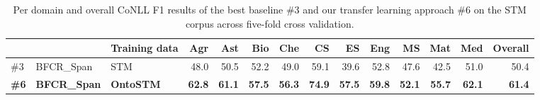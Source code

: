 \documentclass[runningheads]{llncs}
\begin{document}
\begin{comment}
\begin{table}[tb]
\centering
\small
\caption{Results on the tests sets of the SciERC corpus~\cite{Luan2018MultiTaskIO} across 3 random restarts of the approaches: current state of the art of Luan et al., 
the best baseline approach (\#3), and our transfer learning approach (\#6). We report results using the whole and only th of the training data of SciERC.}
\label{tab:coref_results_scierc}
\begin{tabular}{lll|rrr|rrr|rrr|rrr}
  &           &                & \multicolumn{3}{c}{} & \multicolumn{3}{c}{} & \multicolumn{3}{c}{} & \multicolumn{3}{c}{} \\
  &           & Training data  & P      & R      & F1     & P      & R     & F1    & P       & R      & F1     & P       & R      & F1     \\ \hline
\multicolumn{2}{l}{ Luan et al.~\cite{Luan2018MultiTaskIO}} & SciERC 
 & n/a	& n/a	& n/a & n/a	& n/a	& n/a & n/a	& n/a	& n/a & 52.0 & 44.9 & 48.2 \\ \hline
(\#3) & BFCR\_Span & SciERC 
& 63.6	& 57.1	& 60.2 & 62.1	& 54.8	& 58.2 & 64.3	& 55.2	& 59.4 & 63.3	& 55.7	& 59.3 \\ 
(\#6) & BFCR\_Span & OntoNotes
& 65.4	& 57.7	& 61.1 & 63.8	& 55.5	& 59.1 & 62.5	& 58.1	& 60.2 & 63.9	& 57.1	& 60.1 \\
      & (ours)           & SciERC \\
\hline
(\#3) & BFCR\_Span & SciERC 
& 64.2	& 41.3	& 49.0 & 64.9	& 38.0	& 45.7 & 60.3	& 37.9	& 46.4 & 63.1	& 39.1	& 47.1 \\
(\#6) & BFCR\_Span & OntoNotes
& 53.3	& 57.1	& 54.7 & 51.9	& 56.2	& 53.2 & 53.2	& 56.7	& 54.7 & 52.8	& 56.7	& 54.2 \\
      & (ours)            & SciERC
\end{tabular}
\end{table}
\end{comment}



\begin{table}[tb]
\centering
\small
\caption{
Per domain and overall CoNLL F1 results of the best baseline \#3 and our transfer learning approach \#6 on the STM corpus across five-fold cross validation.}
\label{tab:results_per_domain}
\begin{tabular}{lll|r|r|r|r|r|r|r|r|r|r|r}
 & &   Training data & Agr  & Ast  & Bio  & Che  & CS   & ES   & Eng  & MS   & Mat  & Med & Overall  \\ \hline
\#3 & BFCR\_Span & STM & 48.0 & 50.5	& 52.2	& 49.0	& 59.1	& 39.6	& 52.8	& 47.6	& 42.5	& 51.0 & 50.4 \\
\textbf{\#6} & \textbf{BFCR\_Span}  & \textbf{OntoSTM} & \textbf{62.8} & \textbf{61.1} & \textbf{57.5} & \textbf{56.3} & \textbf{74.9} & \textbf{57.5} & \textbf{59.8} & \textbf{52.1} & \textbf{55.7} & \textbf{62.1} & \textbf{61.4}
\end{tabular}
\vspace{-1em}
\end{table}
\end{document}
